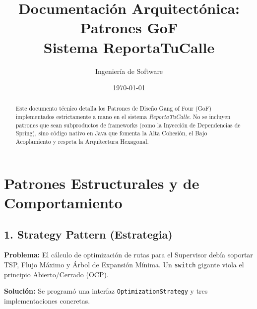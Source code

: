 \documentclass[11pt,a4paper]{article}
\title{\textbf{Documentación Arquitectónica: Patrones GoF}\\ \Large Sistema ReportaTuCalle}
\author{Ingeniería de Software}
\date{\today}
\begin{document}
\maketitle

\begin{abstract}
Este documento técnico detalla los Patrones de Diseño Gang of Four (GoF) implementados estrictamente a mano en el sistema \textit{ReportaTuCalle}. No se incluyen patrones que sean subproductos de frameworks (como la Inyección de Dependencias de Spring), sino código nativo en Java que fomenta la Alta Cohesión, el Bajo Acoplamiento y respeta la Arquitectura Hexagonal.
\end{abstract}

\tableofcontents
\newpage

\section{Patrones Estructurales y de Comportamiento}

\subsection{1. Strategy Pattern (Estrategia)}
\textbf{Problema:} El cálculo de optimización de rutas para el Supervisor debía soportar TSP, Flujo Máximo y Árbol de Expansión Mínima. Un \texttt{switch} gigante viola el principio Abierto/Cerrado (OCP).

\textbf{Solución:} Se programó una interfaz \texttt{OptimizationStrategy} y tres implementaciones concretas.
\end{document}
